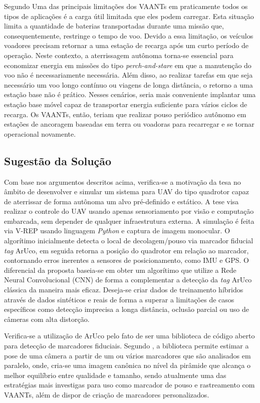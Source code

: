 Segundo \citet{Gilberto2016} Uma das principais limitações dos VAANTs em praticamente todos os tipos de aplicações é a carga útil limitada que eles podem carregar. Esta situação limita a quantidade de baterias transportadas durante uma missão que, consequentemente, restringe o tempo de voo. Devido a essa limitação, os veículos voadores precisam retornar a uma estação de recarga após um curto período de operação. Neste contexto, a aterrissagem autônoma torna-se essencial para economizar energia em missões do tipo \textit{perch-and-stare} em que a manutenção do voo não é necessariamente necessária. Além disso, ao realizar tarefas em que seja necessário um voo longo contínuo ou viagens de longa distância, o retorno a uma estação base não é prático. Nesses cenários, seria mais conveniente implantar uma estação base móvel capaz de transportar energia suficiente para vários ciclos de recarga. Os VAANTs, então, teriam que realizar pouso periódico autônomo em estações de ancoragem baseadas em terra ou voadoras para recarregar e se tornar operacional novamente.

\subsection{Sugestão da Solução}

Com base nos argumentos descritos acima, verifica-se a motivação da tesa no âmbito de desenvolver e simular um sistema para UAV do tipo quadrotor capaz de aterrissar de forma autônoma um alvo pré-definido e estático. A tese visa realizar o controle do UAV usando apenas sensoriamento por visão e computação embarcada, sem depender de qualquer infraestrutura externa. A simulação é feita via V-REP usando linguagem \textit{Python} e captura de imagem monocular. O algorítimo inicialmente detecta o local de decolagem/pouso via marcador fiducial \textit{tag} ArUco, em seguida retorna a posição do quadrotor em relação ao marcador, contornando erros inerentes a sensores de posicionamento, como IMU e GPS. O diferencial da proposta baseia-se em obter um algorítimo que utilize a Rede Neural Convolucional (CNN) de forma a complementar a detecção da \textit{tag} ArUco clássica da maneira mais eficaz. Deseja-se criar dados de treinamento híbridos através de dados sintéticos e reais de forma a superar a limitações de casos específicos como detecção imprecisa a longa distância, oclusão parcial ou uso de câmeras com alta distorção. 

Verifica-se a utilização de ArUco pelo fato de ser uma biblioteca de código aberto para detecção de marcadores fiduciais. Segundo \citet{Aruco2014}, a biblioteca permite estimar a pose de uma câmera a partir de um ou vários marcadores que são analisados em paralelo, onde, cria-se uma imagem canônica no nível da pirâmide que alcança o melhor equilíbrio entre qualidade e tamanho, sendo atualmente uma das estratégias mais investigas para uso como marcador de pouso e rastreamento com VAANTs, além de dispor de criação de marcadores personalizados. 

